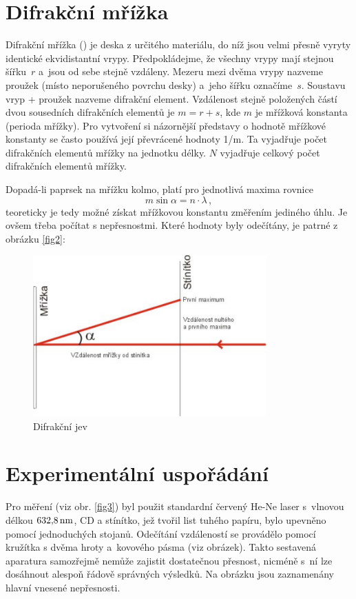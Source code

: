 \documentclass[12pt,a4paper]{article}
\begin{document}
\section{Difrakční mřížka}
Difrakční mřížka () je deska z určitého materiálu, do níž jsou velmi
přesně vyryty identické ekvidistantní vrypy. Předpokládejme, že všechny vrypy
mají stejnou šířku~$r$ a~jsou od sebe stejně vzdáleny. Mezeru mezi dvěma vrypy
nazveme proužek (místo ne\-po\-ru\-še\-né\-ho povrchu desky) a~jeho šířku označíme~$s$.
Soustavu vryp + proužek nazveme difrakční element. Vzdálenost stejně položených
částí dvou sousedních difrakčních elementů je $m=r+s$, kde $m$ je mřížková
konstanta (perioda mřížky). Pro vytvoření si názornější představy o hodnotě mřížkové
konstanty se často používá její převrácené hodnoty 1/m. Ta vyjadřuje počet
difrakčních elementů mřížky na jednotku délky. $N$ vyjadřuje celkový počet
difrakčních elementů mřížky.

Dopadá-li paprsek na mřížku kolmo, platí pro jednotlivá maxima rovnice 
\begin{equation}
m\sin\alpha =n\cdot \lambda \, ,
\end{equation}
teoreticky je tedy možné získat mřížkovou konstantu změřením jediného úhlu. Je ovšem třeba počítat s nepřesnostmi. 
Které hodnoty byly odečítány, je patrné z obrázku \ref{fig2}:

\begin{figure}[ht]
\centering
\includegraphics[width=0.8\textwidth]{Image3}
\caption{Difrakční jev}
\end{figure} \label{fig2}


\section{Experimentální uspořádání}
Pro měření (viz obr. \ref{fig3}) byl použit standardní červený He-Ne laser s~vlnovou délkou  $\rm 632,\!8\,nm$, CD a stínítko, jež tvořil list tuhého papíru,
bylo upevněno pomocí jednoduchých stojanů. Odečítání vzdáleností se provádělo
pomocí kružítka s dvěma hroty a~kovového pásma (viz obrázek). Takto  sestavená aparatura samozřejmě nemůže zajistit dostatečnou
přesnost, nicméně s~ní lze dosáhnout alespoň řádově správných vý\-sle\-dků. Na
obrázku jsou zaznamenány hlavní vnesené nepřesnosti.
\end{document}
